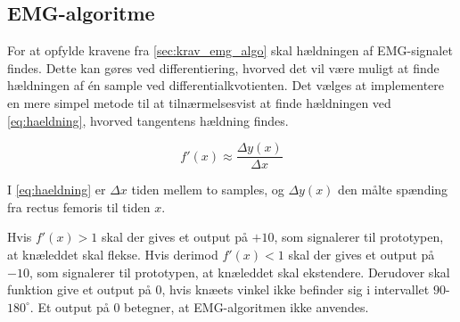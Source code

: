 \subsection{EMG-algoritme} \label{sec:EMG_algo_imp}
For at opfylde kravene fra \autoref{sec:krav_emg_algo} skal hældningen af EMG-signalet findes. 
Dette kan gøres ved differentiering, hvorved det vil være muligt at finde hældningen af én sample ved differentialkvotienten. 
Det vælges at implementere en mere simpel metode til at tilnærmelsesvist at finde hældningen ved \autoref{eq:haeldning}, hvorved tangentens hældning findes.

\begin{equation}
f'(x)\approx\dfrac{\Delta y(x)}{\Delta x}
\label{eq:haeldning}
\end{equation}

\noindent
I \autoref{eq:haeldning} er $\Delta x$ tiden mellem to samples, og $\Delta y(x)$ den målte spænding fra rectus femoris til tiden $x$. 

Hvis $f'(x)>1$ skal der gives et output på $+10$, som signalerer til prototypen, at knæleddet skal flekse. 
Hvis derimod $f'(x)<1$ skal der gives et output på $-10$, som signalerer til prototypen, at knæleddet skal ekstendere. 
Derudover skal funktion give et output på $0$, hvis knæets vinkel ikke befinder sig i intervallet $90$-$180^{\circ}$. Et output på $0$ betegner, at EMG-algoritmen ikke anvendes. 